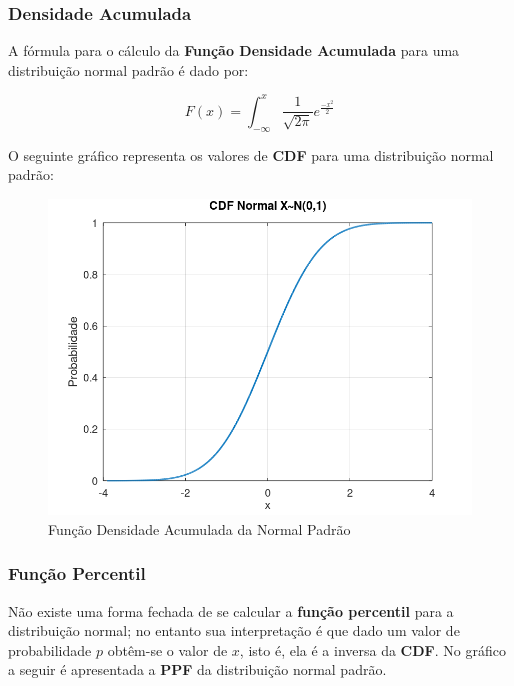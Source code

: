 \documentclass[
]{book}
\begin{document}
\hypertarget{densidade-acumulada}{%
\subsubsection*{Densidade Acumulada}\label{densidade-acumulada}}

A fórmula para o cálculo da \textbf{Função Densidade Acumulada} para uma distribuição normal padrão é dado por:

\begin{equation}
  F(x) = \int_{-\infty}^x \frac{1}{\sqrt{2 \pi}} e^{\frac{-x^2}{2}}
\end{equation}

O seguinte gráfico representa os valores de \textbf{CDF} para uma distribuição normal padrão:

\begin{figure}

{\centering \includegraphics[width=0.5\linewidth]{images/normalcdf} 

}

\caption{Função Densidade Acumulada da Normal Padrão}\label{fig:unnamed-chunk-2}
\end{figure}

\hypertarget{funuxe7uxe3o-percentil}{%
\subsubsection*{Função Percentil}\label{funuxe7uxe3o-percentil}}

Não existe uma forma fechada de se calcular a \textbf{função percentil} para a distribuição normal; no entanto sua interpretação é que dado um valor de probabilidade \(p\) obtêm-se o valor de \(x\), isto é, ela é a inversa da \textbf{CDF}. No gráfico a seguir é apresentada a \textbf{PPF} da distribuição normal padrão.
\end{document}
